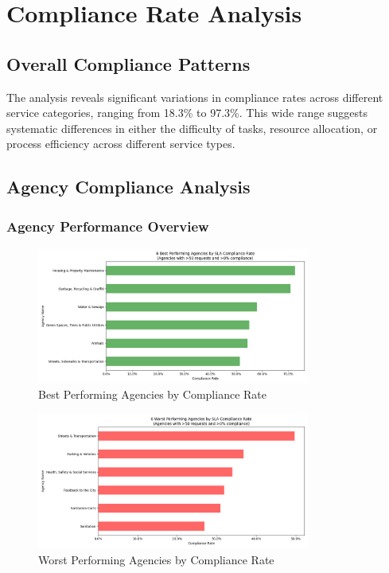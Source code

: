 \documentclass[12pt]{report}
\begin{document}
\chapter{Compliance Rate Analysis}

\section{Overall Compliance Patterns}
The analysis reveals significant variations in compliance rates across different service categories, ranging from 18.3\% to 97.3\%. This wide range suggests systematic differences in either the difficulty of tasks, resource allocation, or process efficiency across different service types.

\section{Agency Compliance Analysis}
\subsection{Agency Performance Overview}

\begin{figure}[H]
\centering
\includegraphics[width=0.8\textwidth]{best_performers_agency}
\caption{Best Performing Agencies by Compliance Rate}
\label{fig:best_agencies}
\end{figure}

\begin{figure}[H]
\centering
\includegraphics[width=0.8\textwidth]{worst_performers_agency}
\caption{Worst Performing Agencies by Compliance Rate}
\label{fig:worst_agencies}
\end{figure}
\end{document}
